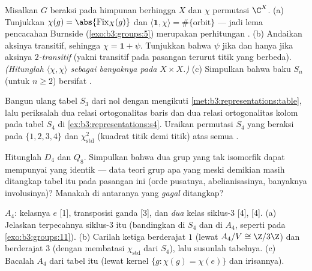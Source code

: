 \begin{exercise}[$\star$]\label{exo:b3:representations:2}
Misalkan $G$ beraksi pada himpunan berhingga $X$ dan $\chi$ 
 permutasi $\C^X$.
(a) Tunjukkan $\chi(g) = \abs{\operatorname{Fix}_X(g)}$ dan
$\langle \mathbf 1, \chi\rangle = \#\{\text{orbit}\}$ ---
jadi lema pencacahan Burnside (\cref{exo:b3:groups:5}) merupakan perhitungan
.
(b) Andaikan aksinya transitif, sehingga $\chi = \mathbf 1 +
\psi$. Tunjukkan bahwa $\psi$  jika dan hanya jika aksinya
\emph{$2$-transitif} (yakni transitif pada pasangan terurut titik yang
berbeda). \emph{(Hitunglah $\langle\chi,\chi\rangle$ sebagai banyaknya
 pada $X \times X$.)}
(c) Simpulkan bahwa  baku $S_n$ (untuk $n \geq
2$) bersifat .
\end{exercise}

\begin{exercise}[$\star$]\label{exo:b3:representations:3}
Bangun ulang tabel $S_3$ dari nol dengan mengikuti
\cref{met:b3:representations:table}, lalu periksalah dua relasi ortogonalitas
baris dan dua relasi ortogonalitas kolom pada tabel $S_4$ di
\cref{ex:b3:representations:s4}. Uraikan  permutasi
$S_4$ yang beraksi pada $\{1,2,3,4\}$ dan 
$\chi_{\mathrm{std}}^2$ (kuadrat titik demi titik) atas semua .
\end{exercise}

\begin{exercise}[$\star\star$]\label{exo:b3:representations:4}
Hitunglah  $D_4$ dan $Q_8$. Simpulkan
bahwa dua grup yang tak isomorfik dapat mempunyai  yang
identik --- data teori grup apa yang meski demikian masih ditangkap
tabel itu pada pasangan ini (orde pusatnya, abelianisasinya,
banyaknya involusinya)? Manakah di antaranya yang \emph{gagal}
ditangkap?
\end{exercise}

\begin{exercise}[$\star\star$]\label{exo:b3:representations:5}
 $A_4$: kelasnya $e$ [1], transposisi ganda
[3], dan \emph{dua} kelas siklus-$3$ [4], [4].
(a) Jelaskan terpecahnya siklus-$3$ itu (bandingkan 
di $S_4$ dan di $A_4$, seperti pada \cref{exo:b3:groups:11}).
(b) Carilah ketiga  berderajat $1$ (lewat $A_4/V \cong
\Z/3\Z$) dan  berderajat $3$ (dengan membatasi
$\chi_{\mathrm{std}}$ dari $S_4$), lalu susunlah tabelnya.
(c) Bacalah  $A_4$ dari tabel itu
(lewat kernel $\{g : \chi(g) = \chi(e)\}$ dan irisannya).
\end{exercise}

